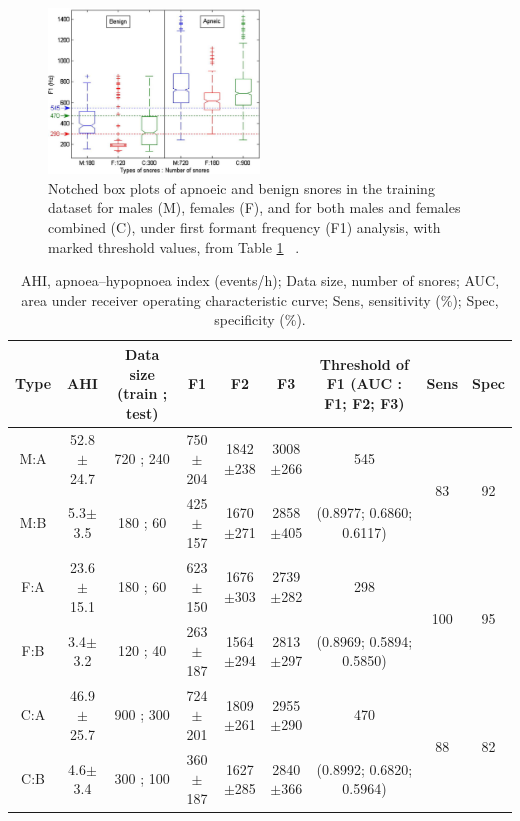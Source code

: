 \begin{figure}[h]
\centering 
\includegraphics[width=0.5\textwidth]{drawings/ng2008afig1}
\caption{Notched box plots of apnoeic and benign snores in the training dataset for males (M), females (F), and for both males and females combined (C), under first formant frequency (F1) analysis, with marked threshold values, from Table \ref{table:ng2008aformantstable1} ~\cite{ng2008could}.}
\label{fig:ng2008afig1}
\end{figure}
\begin{table}[h]
\centering
\begin{tabular}{c c c c c c c c c}
\toprule
Type&AHI&Data size (train ; test)&F1&F2&F3&Threshold of F1 (AUC : F1; F2; F3)&Sens&Spec\\ \midrule
M:A&52.8$\pm$24.7&720 ; 240&750$\pm$204&1842$\pm$238&3008$\pm$266&545&\multirow{2}{*}{83}&\multirow{2}{*}{92}\\ 
M:B&5.3$\pm$3.5&180 ; 60&425$\pm$157&1670$\pm$271&2858$\pm$405&(0.8977; 0.6860; 0.6117)&&\\ 
F:A&23.6$\pm$15.1&180 ; 60&623$\pm$150&1676$\pm$303&2739$\pm$282&298&\multirow{2}{*}{100}&\multirow{2}{*}{95}\\ 
F:B&3.4$\pm$3.2&120 ; 40&263$\pm$187&1564$\pm$294&2813$\pm$297&(0.8969; 0.5894; 0.5850)&&\\ 
C:A&46.9$\pm$25.7&900 ; 300&724$\pm$201&1809$\pm$261&2955$\pm$290&470&\multirow{2}{*}{88}&\multirow{2}{*}{82}\\ 
C:B&4.6$\pm$3.4&300 ; 100&360$\pm$187&1627$\pm$285&2840$\pm$366&(0.8992; 0.6820; 0.5964)&&\\ \bottomrule
\end{tabular}
\caption{AHI, apnoea–hypopnoea index (events/h); Data size, number of snores; AUC, area under receiver operating characteristic curve; Sens, sensitivity (\%); Spec, specificity (\%).}
\label{table:ng2008aformantstable1}
\end{table}
